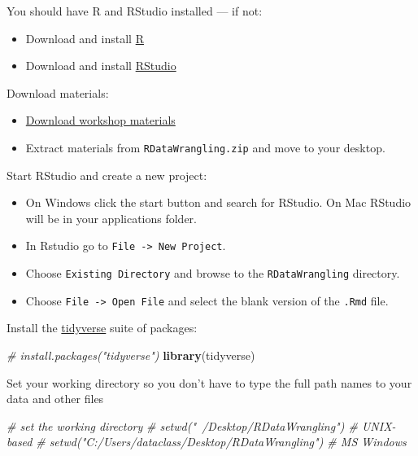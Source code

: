 \documentclass[]{book}
\newenvironment{Shaded}{\begin{snugshade}}{\end{snugshade}}
\newcommand{\KeywordTok}[1]{\textcolor[rgb]{0.13,0.29,0.53}{\textbf{#1}}}
\newcommand{\CommentTok}[1]{\textcolor[rgb]{0.56,0.35,0.01}{\textit{#1}}}
\newcommand{\NormalTok}[1]{#1}
\providecommand{\tightlist}{%
  \setlength{\itemsep}{0pt}\setlength{\parskip}{0pt}}
\begin{document}
You should have R and RStudio installed --- if not:

\begin{itemize}
\tightlist
\item
  Download and install \href{http://cran.r-project.org}{R}
\item
  Download and install
  \href{https://www.rstudio.com/products/rstudio/download/\#download}{RStudio}
\end{itemize}

Download materials:

\begin{itemize}
\tightlist
\item
  \href{http://tutorials.iq.harvard.edu/R/RDataWrangling.zip}{Download
  workshop materials}
\item
  Extract materials from \texttt{RDataWrangling.zip} and move to your
  desktop.
\end{itemize}

Start RStudio and create a new project:

\begin{itemize}
\tightlist
\item
  On Windows click the start button and search for RStudio. On Mac
  RStudio will be in your applications folder.
\item
  In Rstudio go to \texttt{File\ -\textgreater{}\ New\ Project}.
\item
  Choose \texttt{Existing\ Directory} and browse to the
  \texttt{RDataWrangling} directory.
\item
  Choose \texttt{File\ -\textgreater{}\ Open\ File} and select the blank
  version of the \texttt{.Rmd} file.
\end{itemize}

Install the \href{https://www.tidyverse.org/}{tidyverse} suite of
packages:

\begin{Shaded}
\begin{Highlighting}[]
\CommentTok{# install.packages("tidyverse")}
\KeywordTok{library}\NormalTok{(tidyverse)}
\end{Highlighting}
\end{Shaded}

Set your working directory so you don't have to type the full path names
to your data and other files

\begin{Shaded}
\begin{Highlighting}[]
  \CommentTok{# set the working directory}
  \CommentTok{# setwd("~/Desktop/RDataWrangling") # UNIX-based}
  \CommentTok{# setwd("C:/Users/dataclass/Desktop/RDataWrangling") # MS Windows}
\end{Highlighting}
\end{Shaded}
\end{document}
